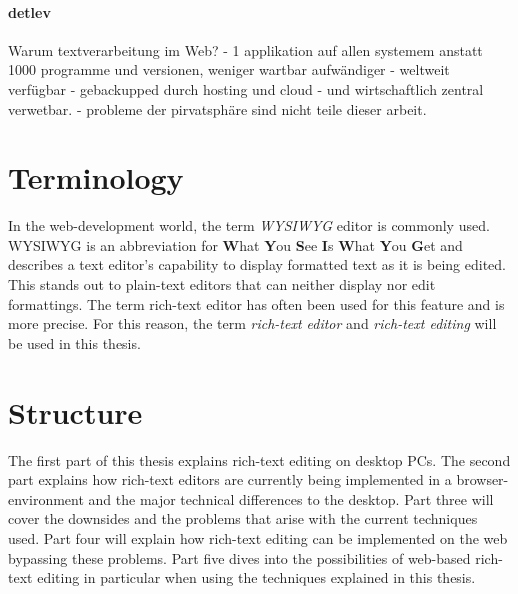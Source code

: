 \paragraph{detlev} Warum textverarbeitung im Web? - 1 applikation auf allen systemem anstatt 1000 programme und versionen, weniger wartbar aufwändiger - weltweit verfügbar - gebackupped durch hosting und cloud - und wirtschaftlich zentral verwetbar. - probleme der pirvatsphäre sind nicht teile dieser arbeit.

\section{Terminology}

In the web-development world, the term \textit{WYSIWYG} editor is commonly used. WYSIWYG is an abbreviation for \textbf{W}hat \textbf{Y}ou \textbf{S}ee \textbf{I}s \textbf{W}hat \textbf{Y}ou \textbf{G}et and describes a text editor's capability to display formatted text as it is being edited. This stands out to plain-text editors that can neither display nor edit formattings. The term rich-text editor has often been used for this feature and is more precise. For this reason, the term \textit{rich-text editor} and \textit{rich-text editing} will be used in this thesis.


\section{Structure}

The first part of this thesis explains rich-text editing on desktop PCs. The second part explains how rich-text editors are currently being implemented in a browser-environment and the major technical differences to the desktop. Part three will cover the downsides and the problems that arise with the current techniques used. Part four will explain how rich-text editing can be implemented on the web bypassing these problems. Part five dives into the possibilities of web-based rich-text editing in particular when using the techniques explained in this thesis.



